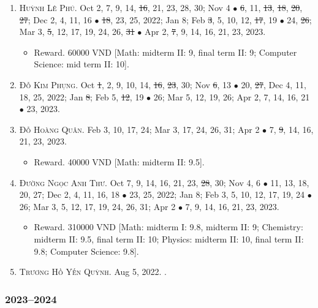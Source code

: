 \documentclass{article}
\begin{document}
\begin{enumerate}
\begin{itemize}
	\end{itemize}
	\item \textsc{Huỳnh Lê Phú.} {\sf[In]} Oct 2, 7, 9, 14, \st{16}, 21, 23, 28, 30; Nov 4 $\bullet$ \st{6}, 11, \st{13}, \st{18}, \st{20}, \st{27}; Dec 2, 4, 11, 16 $\bullet$ \st{18}, 23, 25, 2022; Jan 8; Feb \st{3}, 5, 10, 12, \st{17}, 19 $\bullet$ 24, \st{26}; Mar 3, \st{5}, 12, 17, 19, 24, 26, \st{31} $\bullet$ Apr 2, \st{7}, 9, 14, 16, 21, 23, 2023.
	\begin{itemize}
		\item {\sf Reward.} 60000 VND [Math: midterm II: 9, final term II: 9; Computer Science: mid term II: 10].
	\end{itemize}
	\item \textsc{Đỗ Kim Phụng.} {\sf[In]} Oct \st{1}, 2, 9, 10, 14, \st{16}, \st{23}, 30; Nov \st{6}, 13 $\bullet$ 20, \st{27}, Dec 4, 11, 18, 25, 2022; Jan \st{8}; Feb 5, \st{12}, 19 $\bullet$ 26; Mar 5, 12, 19, 26; Apr 2, 7, 14, 16, 21 $\bullet$ 23, 2023.
	\item \textsc{Đỗ Hoàng Quân.} {\sf[In]} Feb 3, 10, 17, 24; Mar 3, 17, 24, 26, 31; Apr 2 $\bullet$ 7, \st{9}, 14, 16, 21, 23, 2023.
	\begin{itemize}
		\item {\sf Reward.} 40000 VND [Math: midterm II: 9.5].
	\end{itemize}
	\item \textsc{Đường Ngọc Anh Thư.} {\sf[In]} Oct 7, 9, 14, 16, 21, 23, \st{28}, 30; Nov 4, 6 $\bullet$ 11, 13, 18, 20, 27; Dec 2, 4, 11, 16, 18 $\bullet$ 23, 25, 2022; Jan 8; Feb 3, 5, 10, 12, 17, 19, 24 $\bullet$ 26; Mar 3, 5, 12, 17, 19, 24, 26, 31; Apr 2 $\bullet$ 7, 9, 14, 16, 21, 23, 2023.
	\begin{itemize}
		\item {\sf Reward.} 310000 VND [Math: midterm I: 9.8, midterm II: 9; Chemistry: midterm II: 9.5, final term II: 10; Physics: midterm II: 10, final term II: 9.8; Computer Science: 9.8].
	\end{itemize}
	\item \textsc{Trương Hồ Yến Quỳnh.} {\sf[In]} Aug 5, 2022. {\sf[Out]}.
\end{enumerate}

\subsubsection{2023--2024}

\end{document}
